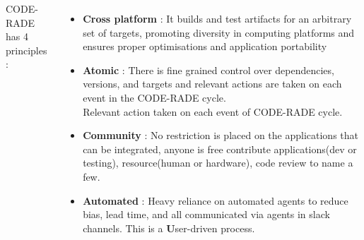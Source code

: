 \documentclass[17pt, a0paper, landscape, margin=0mm, innermargin=15mm,
     blockverticalspace=10mm, colspace=5mm, subcolspace=8mm]{tikzposter} %
\begin{document}
\begin{columns}
{  %
%
\newline
         CODE-RADE has 4 principles :
         \begin{itemize}
                 \item \textbf{Cross platform} : It builds and test artifacts for an arbitrary set of targets, promoting diversity in computing platforms and ensures proper optimisations and application portability 
                \item \textbf{Atomic} :
                                 There is fine grained control over dependencies, versions, and targets and relevant actions are taken on each event in the CODE-RADE cycle. \\
                                 Relevant action taken on each event of CODE-RADE cycle. 
                  \item \textbf{Community} :
                      No restriction is placed on the applications that can be integrated, anyone is free contribute applications(dev or testing), resource(human or hardware), code review to name a few. 
                  \item \textbf{Automated} :
                                 Heavy reliance on automated agents to reduce bias, lead time, and all communicated via agents in slack channels. This is a \textbf User-driven process. 
             \end{itemize}

}
\end{columns}
\end{document}
